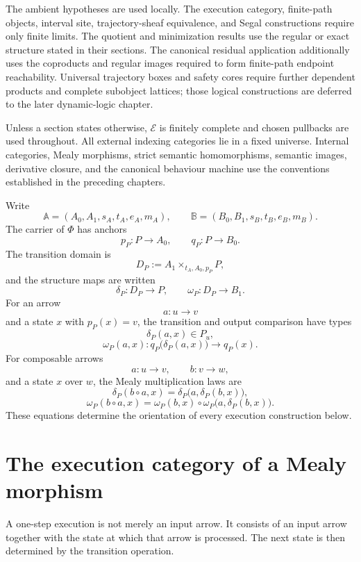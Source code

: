 The ambient hypotheses are used locally.  The execution category, finite-path
objects, interval site, trajectory-sheaf equivalence, and Segal constructions
require only finite limits.  The quotient and minimization results use the
regular or exact structure stated in their sections.  The canonical residual
application additionally uses the coproducts and regular images required to
form finite-path endpoint reachability.  Universal trajectory boxes and
safety cores require further dependent products and complete subobject
lattices; those logical constructions are deferred to the later dynamic-logic
chapter.

Unless a section states otherwise, \(\mathcal E\) is finitely complete and
chosen pullbacks are used throughout.  All external indexing categories lie
in a fixed universe.  Internal categories, Mealy morphisms, strict semantic
homomorphisms, semantic images, derivative closure, and the canonical
behaviour machine use the conventions established in the preceding chapters.

Write
\[
    \mathbb A=(A_0,A_1,s_A,t_A,e_A,m_A),
    \qquad
    \mathbb B=(B_0,B_1,s_B,t_B,e_B,m_B).
\]
The carrier of \(\Phi\) has anchors
\[
    p_P:P\to A_0,
    \qquad
    q_P:P\to B_0.
\]
The transition domain is
\[
    D_P
    :=
    A_1\times_{t_A,A_0,p_P}P,
\]
and the structure maps are written
\[
    \delta_P:D_P\to P,
    \qquad
    \omega_P:D_P\to B_1.
\]
For an arrow
\[
    a:u\to v
\]
and a state \(x\) with \(p_P(x)=v\), the transition and output comparison
have types
\[
    \delta_P(a,x)\in P_u,
\]
\[
    \omega_P(a,x):
    q_P\bigl(\delta_P(a,x)\bigr)
    \longrightarrow
    q_P(x).
\]
For composable arrows
\[
    a:u\to v,
    \qquad
    b:v\to w,
\]
and a state \(x\) over \(w\), the Mealy multiplication laws are
\[
    \delta_P(b\circ a,x)
    =
    \delta_P\bigl(a,\delta_P(b,x)\bigr),
\]
\[
    \omega_P(b\circ a,x)
    =
    \omega_P(b,x)
    \circ
    \omega_P\bigl(a,\delta_P(b,x)\bigr).
\]
These equations determine the orientation of every execution construction
below.

\section{The execution category of a Mealy morphism}
\label{subsec:mealy-action-category}

A one-step execution is not merely an input arrow. It consists of an input
arrow together with the state at which that arrow is processed. The next state
is then determined by the transition operation.

